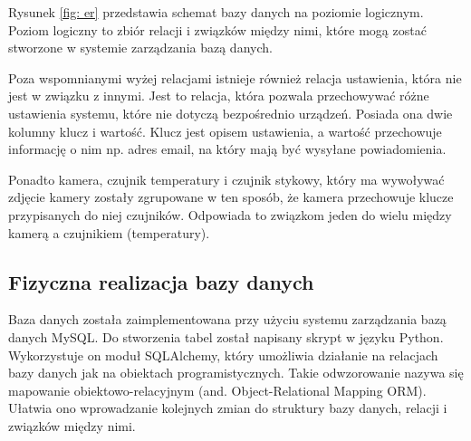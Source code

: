 \documentclass[a4paper,12pt,twoside]{article}
\begin{document}
Rysunek \ref{fig: er} przedstawia schemat bazy danych na poziomie logicznym. Poziom logiczny to zbiór relacji i związków między nimi, które mogą zostać stworzone w systemie zarządzania bazą danych. 

Poza wspomnianymi wyżej relacjami istnieje również relacja ustawienia, która nie jest w związku z innymi. Jest to relacja, która pozwala przechowywać różne ustawienia systemu, które nie dotyczą bezpośrednio urządzeń. Posiada ona dwie kolumny klucz i wartość. Klucz jest opisem ustawienia, a wartość przechowuje informację o nim np. adres email, na który mają być wysyłane powiadomienia. 

Ponadto kamera, czujnik temperatury i czujnik stykowy, który ma wywoływać zdjęcie kamery zostały zgrupowane w ten sposób, że kamera przechowuje klucze przypisanych do niej czujników. Odpowiada to związkom jeden do wielu między kamerą a czujnikiem (temperatury).

\subsection{Fizyczna realizacja bazy danych}
Baza danych została zaimplementowana przy użyciu systemu zarządzania bazą danych MySQL. Do stworzenia tabel został napisany skrypt w języku Python. Wykorzystuje on moduł SQLAlchemy, który umożliwia działanie na relacjach bazy danych jak na obiektach programistycznych. Takie odwzorowanie nazywa się mapowanie obiektowo-relacyjnym (and. Object-Relational Mapping ORM). Ułatwia ono wprowadzanie kolejnych zmian do struktury bazy danych, relacji i związków między nimi.
\end{document}
